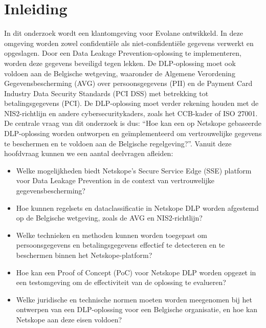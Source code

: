 


% 

\section{Inleiding}%
\label{sec:inleiding}

In dit onderzoek wordt een klantomgeving voor Evolane ontwikkeld. 
In deze omgeving worden zowel confidentiële als niet-confidentiële gegevens verwerkt en opgeslagen. 
Door een Data Leakage Prevention-oplossing te implementeren, worden deze gegevens beveiligd tegen lekken. De DLP-oplossing moet ook voldoen aan de Belgische wetgeving, 
waaronder de Algemene Verordening Gegevensbescherming (AVG) over persoonsgegevens (PII) en de Payment Card Industry Data Security Standards (PCI DSS) met betrekking tot betalingsgegevens (PCI). 
De DLP-oplossing moet verder rekening houden met de NIS2-richtlijn en andere cybersecuritykaders, zoals het CCB-kader of ISO 27001. 
De centrale vraag van dit onderzoek is dus: “Hoe kan een op Netskope gebaseerde DLP-oplossing worden ontworpen en geïmplementeerd om vertrouwelijke gegevens te beschermen en te voldoen aan de Belgische regelgeving?”. 
Vanuit deze hoofdvraag kunnen we een aantal deelvragen afleiden:

\begin{itemize}
    \item Welke mogelijkheden biedt Netskope's Secure Service Edge (SSE) platform voor Data Leakage Prevention in de context van vertrouwelijke gegevensbescherming?
    \item Hoe kunnen regelsets en dataclassificatie in Netskope DLP worden afgestemd op de Belgische wetgeving, zoals de AVG en NIS2-richt\-lijn?
    \item Welke technieken en methoden kunnen worden toegepast om persoonsgegevens en betalingsgegevens effectief te detecteren en te beschermen binnen het Net\-skope-platform?
    \item Hoe kan een Proof of Concept (PoC) voor Netskope DLP worden opgezet in een testomgeving om de effectiviteit van de oplossing te evalueren?
    \item Welke juridische en technische normen moeten worden meegenomen bij het ontwerpen van een DLP-oplossing voor een Belgische organisatie, en hoe kan Netskope aan deze eisen voldoen?
\end{itemize}

